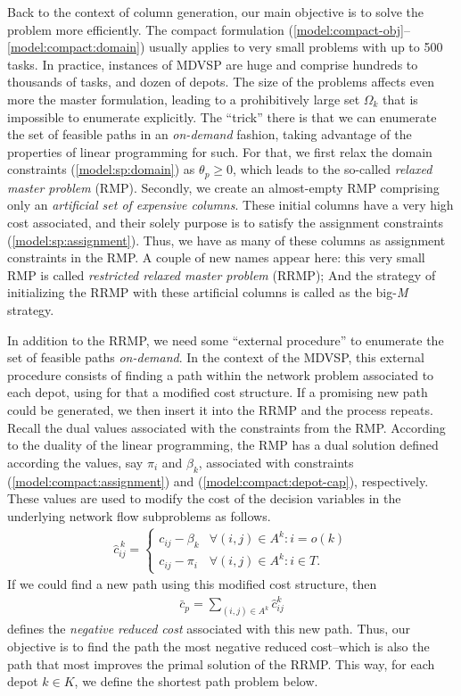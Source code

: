 \documentclass{article}
\begin{document}
Back to the context of column generation, our main objective is to solve the problem more efficiently. The compact formulation (\ref{model:compact-obj}--\ref{model:compact:domain}) usually applies to very small problems with up to 500 tasks. In practice, instances of MDVSP are huge and comprise hundreds to thousands of tasks, and dozen of depots. The size of the problems affects even more the master formulation, leading to a prohibitively large set $\Omega_k$ that is impossible to enumerate explicitly. The ``trick'' there is that we can enumerate the set of feasible paths in an \textit{on-demand} fashion, taking advantage of the properties of linear programming for such. For that, we first relax the domain constraints (\ref{model:sp:domain}) as $\theta_p \geqslant 0$, which leads to the so-called \textit{relaxed master problem} (RMP). Secondly, we create an almost-empty RMP comprising only an \textit{artificial set of expensive columns}. These initial columns have a very high cost associated, and their solely purpose is to satisfy the assignment constraints (\ref{model:sp:assignment}). Thus, we have as many of these columns as assignment constraints in the RMP. A couple of new names appear here: this very small RMP is called \textit{restricted relaxed master problem} (RRMP); And the strategy of initializing the RRMP with these artificial columns is called as the big-\textit{M} strategy.

In addition to the RRMP, we need some ``external procedure''
to enumerate the set of feasible paths \textit{on-demand}. In the context of the MDVSP, this external procedure consists of finding a path within the network problem associated to each depot, using for that a modified cost structure. If a promising new path could be generated, we then insert it into the RRMP and the process repeats. Recall the dual values associated with the constraints from the RMP. According to the duality of the linear programming, the RMP has a dual solution defined according the values, say $\pi_i$ and $\beta_k$, associated with constraints (\ref{model:compact:assignment}) and (\ref{model:compact:depot-cap}), respectively. These values are used to modify the cost of the decision variables in the underlying network flow subproblems as follows.
\begin{align}
   \hat{c}^{\,k}_{ij} =
   \begin{cases}
      c_{ij} - \beta_k & \forall (i,j) \in A^k : i = o(k)\\
      c_{ij} - \pi_i & \forall (i,j) \in A^k : i \in T.
   \end{cases}
\end{align}
If we could find a new path using this modified cost structure, then
\begin{align}
   \bar{c}_p = \sum_{(i,j) \in A^k} \hat{c}^k_{ij}
\end{align}
defines the \textit{negative reduced cost} associated with this new path. Thus, our objective is to find the path the most negative reduced cost--which is also the path that most improves the primal solution of the RRMP. This way, for each depot $k \in K$, we define the shortest path problem below.
\end{document}

